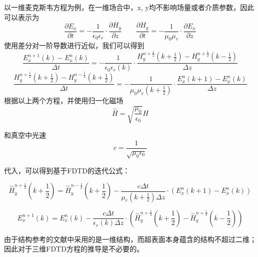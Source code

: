 以一维麦克斯韦方程为例，在一维场合中，x, y均不影响场量或者介质参数，因此可以表示为
\begin{displaymath}
\frac{\partial E_{x}}{\partial t} = -\frac{1}{\epsilon _{0} \epsilon _{r}} \cdot{} \frac{\partial H_{y}}{\partial z} \qquad \frac{\partial H_{y}}{\partial t} = -\frac{1}{\mu _{0}\mu _{r}} \cdot{} \frac{\partial E_{x}}{\partial z}
\end{displaymath}
使用差分对一阶导数进行近似，我们可以得到
\begin{equation}
\frac{E^{n+1}_{x}(k) - E^{n}_{x}(k)}{\Delta t} = -\frac{1}{\epsilon _0\epsilon _{r}(k)} \cdot{} \frac{H^{n+\frac{1}{2}}_y \left (k+\frac{1}{2} \right) - H^{n+\frac{1}{2}}_y \left (k-\frac{1}{2} \right )}{\Delta z}
\end{equation}
\begin{equation}
\frac{H^{n+\frac{1}{2}}_y \left (k + \frac{1}{2} \right ) - H^{n-\frac{1}{2}}_y \left (k+\frac{1}{2} \right )}{\Delta t} = -\frac{1}{\mu _0\mu _r \left (k+\frac{1}{2} \right )} \cdot{} \frac{E^n_x \left (k+1 \right) - E^n_x \left (k \right )}{\Delta z}
\end{equation}
根据以上两个方程，并使用归一化磁场
\begin{displaymath}
\stackrel{\sim}{H} = \sqrt{\frac{\mu _0}{\epsilon _0}}H
\end{displaymath}

和真空中光速
\begin{displaymath}
c = \frac{1}{\sqrt{\mu _0 \epsilon _0}}
\end{displaymath}

代入，可以得到基于FDTD的迭代公式：

\begin{equation}
\stackrel{\sim}{H}^{n+\frac{1}{2}}_{y} \left (k + \frac{1}{2} \right ) = \stackrel{\sim}{H}^{n - \frac{1}{2}}_y \left (k + \frac{1}{2} \right ) - \frac{c\Delta t}{\mu _r\left (k + \frac{1}{2} \right ) \Delta z} \cdot{} \left ( E^n_x (k + 1) - E^n_x (k) \right )
\end{equation}

\begin{equation}
E^{n + 1}_x \left (k \right ) = E^n_x \left ( k \right ) - \frac {c \Delta t}{\epsilon _r \left (k \right ) \Delta z} \cdot{} \left ( \stackrel{\sim}{H}^{n + \frac{1}{2}}_y \left (k + \frac{1}{2} \right ) - \stackrel{\sim}{H}^{n + \frac{1}{2}}_y \left (k - \frac{1}{2} \right ) \right )
\end{equation}

由于结构参考的文献中采用的是一维结构，而超表面本身蕴含的结构不超过二维；因此对于三维FDTD方程的推导是不必要的。

